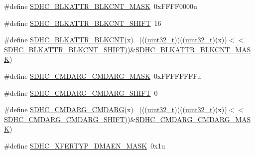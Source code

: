 \begin{DoxyCompactItemize}
\item 
\#define \hyperlink{group___s_d_h_c___register___masks_ga797a081db083b97f61d5f657ae83f752}{S\+D\+H\+C\+\_\+\+B\+L\+K\+A\+T\+T\+R\+\_\+\+B\+L\+K\+C\+N\+T\+\_\+\+M\+A\+SK}~0x\+F\+F\+F\+F0000u
\item 
\#define \hyperlink{group___s_d_h_c___register___masks_ga1461e7582635ec25e017243f95a9e649}{S\+D\+H\+C\+\_\+\+B\+L\+K\+A\+T\+T\+R\+\_\+\+B\+L\+K\+C\+N\+T\+\_\+\+S\+H\+I\+FT}~16
\item 
\#define \hyperlink{group___s_d_h_c___register___masks_ga1b3088859a5a9ee3ccb5f35b757a99a2}{S\+D\+H\+C\+\_\+\+B\+L\+K\+A\+T\+T\+R\+\_\+\+B\+L\+K\+C\+NT}(x)                                  ~(((\hyperlink{_p_e___types_8h_a33594304e786b158f3fb30289278f5af}{uint32\+\_\+t})(((\hyperlink{_p_e___types_8h_a33594304e786b158f3fb30289278f5af}{uint32\+\_\+t})(x))$<$$<$\hyperlink{group___s_d_h_c___register___masks_ga1461e7582635ec25e017243f95a9e649}{S\+D\+H\+C\+\_\+\+B\+L\+K\+A\+T\+T\+R\+\_\+\+B\+L\+K\+C\+N\+T\+\_\+\+S\+H\+I\+FT}))\&\hyperlink{group___s_d_h_c___register___masks_ga797a081db083b97f61d5f657ae83f752}{S\+D\+H\+C\+\_\+\+B\+L\+K\+A\+T\+T\+R\+\_\+\+B\+L\+K\+C\+N\+T\+\_\+\+M\+A\+SK})
\item 
\#define \hyperlink{group___s_d_h_c___register___masks_ga96ab88ba50cc09465c266e3aab2ba3b0}{S\+D\+H\+C\+\_\+\+C\+M\+D\+A\+R\+G\+\_\+\+C\+M\+D\+A\+R\+G\+\_\+\+M\+A\+SK}~0x\+F\+F\+F\+F\+F\+F\+F\+Fu
\item 
\#define \hyperlink{group___s_d_h_c___register___masks_gaa96f4afe969ac51d89ac52df46867f0a}{S\+D\+H\+C\+\_\+\+C\+M\+D\+A\+R\+G\+\_\+\+C\+M\+D\+A\+R\+G\+\_\+\+S\+H\+I\+FT}~0
\item 
\#define \hyperlink{group___s_d_h_c___register___masks_gaf17d39bc4152b201b9cad32cc96da69b}{S\+D\+H\+C\+\_\+\+C\+M\+D\+A\+R\+G\+\_\+\+C\+M\+D\+A\+RG}(x)                                    ~(((\hyperlink{_p_e___types_8h_a33594304e786b158f3fb30289278f5af}{uint32\+\_\+t})(((\hyperlink{_p_e___types_8h_a33594304e786b158f3fb30289278f5af}{uint32\+\_\+t})(x))$<$$<$\hyperlink{group___s_d_h_c___register___masks_gaa96f4afe969ac51d89ac52df46867f0a}{S\+D\+H\+C\+\_\+\+C\+M\+D\+A\+R\+G\+\_\+\+C\+M\+D\+A\+R\+G\+\_\+\+S\+H\+I\+FT}))\&\hyperlink{group___s_d_h_c___register___masks_ga96ab88ba50cc09465c266e3aab2ba3b0}{S\+D\+H\+C\+\_\+\+C\+M\+D\+A\+R\+G\+\_\+\+C\+M\+D\+A\+R\+G\+\_\+\+M\+A\+SK})
\item 
\#define \hyperlink{group___s_d_h_c___register___masks_ga4d3f71daacb879dbeb42972d25faa220}{S\+D\+H\+C\+\_\+\+X\+F\+E\+R\+T\+Y\+P\+\_\+\+D\+M\+A\+E\+N\+\_\+\+M\+A\+SK}~0x1u

\end{DoxyCompactItemize}
